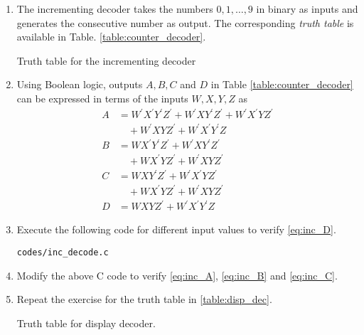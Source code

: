\renewcommand{\theequation}{\theenumi}
\renewcommand{\thefigure}{\theenumi}
\begin{enumerate}[label=\thesection.\arabic*.,ref=\thesection.\theenumi]

\item The incrementing decoder   takes the numbers $0,1,\dots,9$ in binary as inputs and generates
the consecutive number as output.  The corresponding {\em truth table} is available in Table. \ref{table:counter_decoder}.
\begin{table}[!h]
\centering

\caption{Truth table for the incrementing decoder}
\label{table:counter_decoder}
\end{table}
\item Using Boolean logic, outputs $A, B, C$ and $D$  in Table \ref{table:counter_decoder} can be expressed in terms of the inputs $W,X,Y,Z$ as
%
\begin{align}
\label{eq:inc_A}
A &= W^{\prime}X^{\prime}Y^{\prime}Z^{\prime} + W^{\prime}XY^{\prime}Z^{\prime}
+W^{\prime}X^{\prime}YZ^{\prime}
\nonumber \\
 & \quad +W^{\prime}XYZ^{\prime}
+W^{\prime}X^{\prime}Y^{\prime}Z
\\
\label{eq:inc_B}
B &= WX^{\prime}Y^{\prime}Z^{\prime} + W^{\prime}XY^{\prime}Z^{\prime}
\nonumber \\ 
& \quad 
+WX^{\prime}YZ^{\prime}
+W^{\prime}XYZ^{\prime}
\\
\label{eq:inc_C}
C &= WXY^{\prime}Z^{\prime} + W^{\prime}X^{\prime}YZ^{\prime}
\nonumber \\ 
& \quad 
+WX^{\prime}YZ^{\prime}
+W^{\prime}XYZ^{\prime}
\\
D &= WXYZ^{\prime} + W^{\prime}X^{\prime}Y^{\prime}Z
\label{eq:inc_D}
\end{align}
\item Execute the following code for different input values to verify \eqref{eq:inc_D}.
\label{code:inc_decode}
\begin{lstlisting}
codes/inc_decode.c
\end{lstlisting}
\item Modify the above C code to verify \eqref{eq:inc_A}, \eqref{eq:inc_B}
and \eqref{eq:inc_C}.
%
\item Repeat the exercise for the truth table in \ref{table:disp_dec}.
%
\begin{table}
\centering

\caption{Truth table for display decoder.}
\label{table:disp_dec}
\end{table}

\end{enumerate}
%
%
